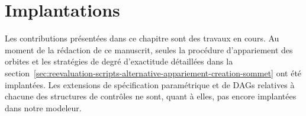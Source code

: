 \section{Implantations}
\label{sec:reevaluation-scripts-implantation}

Les contributions présentées dans ce chapitre sont des travaux en cours. %
Au moment de la rédaction de ce manuscrit, seules la procédure d'appariement des
orbites et les stratégies de degré d'exactitude détaillées dans la
section~\ref{sec:reevaluation-scripts-alternative-appariement-creation-sommet}
ont été implantées. %
Les extensions de spécification paramétrique et de DAGs relatives à chacune des
structures de contrôles ne sont, quant à elles, pas encore implantées dans notre
modeleur. %

